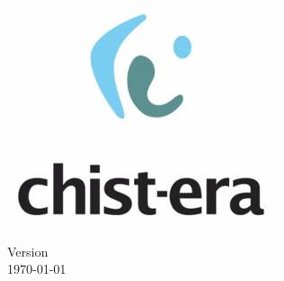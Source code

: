 \begin{titlepage}
  \begin{minipage}{0.38\textwidth}
    \centering
    \includegraphics[width=.6\linewidth]{images/chistera_logo.png}
  \end{minipage}\hfill
  \begin {minipage}{0.28\textwidth}
    \centering
    \vspace{2cm}
    \small Version \Version \\ \today
  \end{minipage}
\end{titlepage}
\newpage


